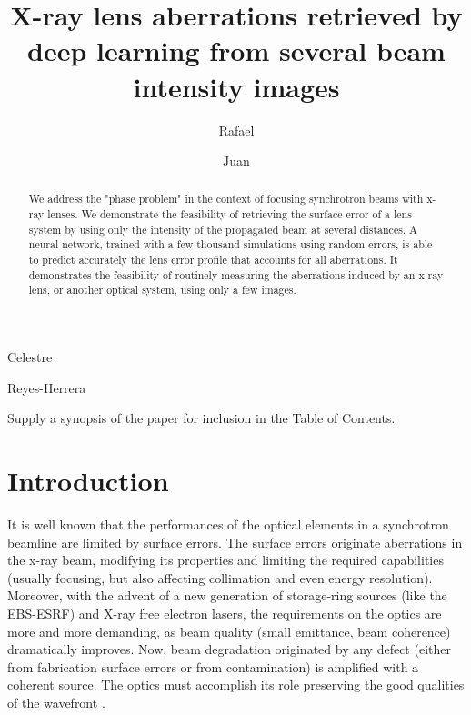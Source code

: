 \documentclass{iucr}
\newcommand{\jsrblue}[1]{\textcolor{JSR_blue}{#1}}
\begin{document}
   

\title{X-ray lens aberrations retrieved by deep learning from several beam intensity images}

\cauthor[a]{\jsrblue{Manuel}}{\jsrblue{Sanchez del Rio}}{srio@esrf.eu}{}

\author[a]{\jsrblue{Rafael}}{\jsrblue{Celestre}}
\author[a]{\jsrblue{Juan}}{\jsrblue{Reyes-Herrera}} 


\maketitle                        %

\begin{synopsis}
Supply a synopsis of the paper for inclusion in the Table of Contents.
\end{synopsis}

\begin{abstract}
We address the "phase problem" in the context of focusing synchrotron beams with x-ray lenses. We demonstrate the feasibility of retrieving the surface error of a lens system by using only the intensity of the propagated beam at several distances. A neural network, trained with a few thousand simulations using random errors, is able to predict accurately the lens error profile that accounts for all aberrations. It demonstrates the feasibility of routinely measuring the aberrations induced by an x-ray lens, or another optical system, using only a few images. 
\end{abstract}




\section{Introduction}\label{sec:intro}

It is well known that the performances of the optical elements in  a synchrotron beamline are limited by surface errors. The surface errors originate aberrations in the x-ray beam, modifying its properties and limiting the required capabilities (usually focusing, but also affecting collimation and even energy resolution). Moreover, with the advent of a new generation of storage-ring sources (like the EBS-ESRF) and X-ray free electron lasers, the requirements on the optics are more and more demanding, as beam quality (small emittance, beam coherence) dramatically improves.  Now, beam degradation originated by any defect (either from fabrication surface errors or from contamination) is amplified with a coherent source. The optics must accomplish its role preserving the good qualities of the wavefront \cite{Cocco2022}. 
\end{document}
